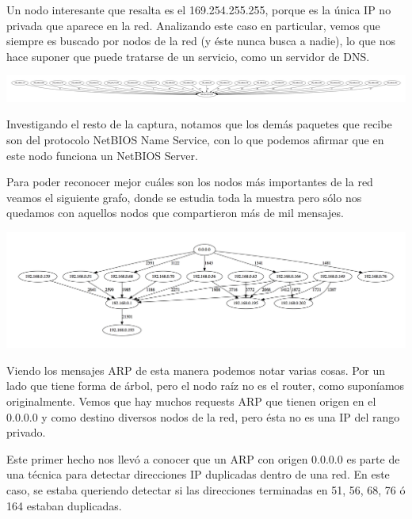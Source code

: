 Un nodo interesante que resalta es el 169.254.255.255, porque es la única IP no privada que aparece en la red. Analizando este caso en particular, vemos que siempre es buscado por nodos de la red (y éste nunca busca a nadie), lo que nos hace suponer que puede tratarse de un servicio, como un servidor de DNS.\newline

\includegraphics[scale=0.25,clip=true,trim=850 0 870 0]{graphics/t-work-ip-169-254-255-255.png}

Investigando el resto de la captura, notamos que los demás paquetes que recibe son del protocolo NetBIOS Name Service, con lo que podemos afirmar que en este nodo funciona un NetBIOS Server.\newline

Para poder reconocer mejor cuáles son los nodos más importantes de la red veamos el siguiente grafo, donde se estudia toda la muestra pero sólo nos quedamos con aquellos nodos que compartieron más de mil mensajes.\newline

\includegraphics[scale=0.30]{graphics/t-work-all-1000w.png}

Viendo los mensajes ARP de esta manera podemos notar varias cosas. Por un lado que tiene forma de árbol, pero el nodo raíz no es el router, como suponíamos originalmente. Vemos que hay muchos requests ARP que tienen origen en el 0.0.0.0 y como destino diversos nodos de la red, pero ésta no es una IP del rango privado.\newline

Este primer hecho nos llevó a conocer que un ARP con origen 0.0.0.0 es parte de una técnica para detectar direcciones IP duplicadas dentro de una red. En este caso, se estaba queriendo detectar si las direcciones terminadas en 51, 56, 68, 76 ó 164 estaban duplicadas.\newline

\newpage

